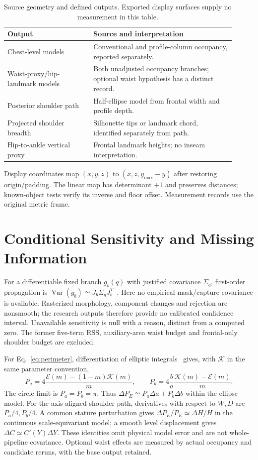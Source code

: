 \documentclass[11pt,a4paper]{article}
\begin{document}
\begin{table}[htbp]
\centering
\caption{Source geometry and defined outputs. Exported display surfaces supply no measurement in this table.}
\label{tab:branches}
\small
\begin{tabular}{p{0.34\linewidth}p{0.57\linewidth}}
\toprule
Output & Source and interpretation\\
\midrule
Chest-level models & Conventional and profile-column occupancy, reported separately.\\
Waist-proxy/hip-landmark models & Both unadjusted occupancy branches; optional waist hypothesis has a distinct record.\\
Posterior shoulder path & Half-ellipse model from frontal width and profile depth.\\
Projected shoulder breadth & Silhouette tips or landmark chord, identified separately from path.\\
Hip-to-ankle vertical proxy & Frontal landmark heights; no inseam interpretation.\\
\bottomrule
\end{tabular}
\end{table}

Display coordinates map $(x,y,z)$ to $(x,z,y_{\max}-y)$ after restoring origin/padding. The linear map has determinant $+1$ and preserves distances; known-object tests verify its inverse and floor offset. Measurement records use the original metric frame.

\section{Conditional Sensitivity and Missing Information}
For a differentiable fixed branch $g_b(q)$ with justified covariance $\Sigma_q$, first-order propagation is $\operatorname{Var}(g_b)\simeq J_b\Sigma_qJ_b^T$~\cite{jcgm2008}. Here no empirical mask/capture covariance is available. Rasterized morphology, component changes and rejection are nonsmooth; the research outputs therefore provide no calibrated confidence interval. Unavailable sensitivity is null with a reason, distinct from a computed zero. The former five-term RSS, auxiliary-area waist budget and frontal-only shoulder budget are excluded.

For Eq.~\eqref{eq:perimeter}, differentiation of elliptic integrals~\cite{dlmfelliptic} gives, with $\mathcal K$ in the same parameter convention,
\begin{equation}
 P_a=4\frac{\mathcal E(m)-(1-m)\mathcal K(m)}m,\qquad
 P_b=4\frac{b}{a}\frac{\mathcal K(m)-\mathcal E(m)}m.
 \label{eq:derivative}
\end{equation}
The circle limit is $P_a=P_b=\pi$. Thus $\Delta P_E\simeq P_a\Delta a+P_b\Delta b$ within the ellipse model. For the axis-aligned shoulder path, derivatives with respect to $W,D$ are $P_a/4,P_b/4$. A common stature perturbation gives $\Delta P_E/P_E\simeq\Delta H/H$ in the continuous scale-equivariant model; a smooth level displacement gives $\Delta C\simeq C'(Y)\Delta Y$. These identities omit physical model error and are not whole-pipeline covariance. Optional waist effects are measured by actual occupancy and candidate reruns, with the base output retained.
\end{document}
